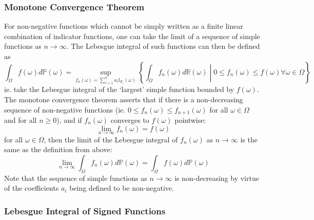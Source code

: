 \documentclass[11pt]{report} %
\begin{document}
\subsubsection{Monotone Convergence Theorem}

For non-negative functions which cannot be simply written as a finite linear combination of indicator functions, one can take the limit of a sequence of simple functions as $n \to \infty$. The Lebesgue integral of such functions can then be defined as
\begin{equation}
\int_{\Omega}f\left(\omega\right)d\mathbb{P}\left(\omega\right) = \sup_{f_{n}\left(\omega\right) = \sum_{i = 1}^{n}a_{i}\mathbb{I}_{E_{i}}\left(\omega\right)}\left\{\int_{\Omega}f_{n}\left(\omega\right)d\mathbb{R}\left(\omega\right)\middle|0\leq f_{n}\left(\omega\right) \leq f\left(\omega\right)\forall \omega \in \Omega\right\}
\end{equation}
ie. take the Lebesgue integral of the `largest' simple function bounded by $f\left(\omega\right)$. The monotone convergence theorem asserts that if there is a non-decreasing sequence of non-negative functions (ie. $0 \leq f_{n}\left(\omega\right) \leq f_{n + 1}\left(\omega\right)$ for all $\omega \in \Omega$ and for all $n \geq 0$), and if $f_{n}\left(\omega\right)$ converges to $f\left(\omega\right)$ pointwise:
\begin{equation}
\lim_{n\to\infty}f_{n}\left(\omega\right) = f\left(\omega\right)
\end{equation}
for all $\omega \in \Omega$, then the limit of the Lebesgue integral of $f_{n}\left(\omega\right)$ as $n \to \infty$ is the same as the definition from above:
\begin{equation}
\lim_{n\to\infty}\int_{\Omega}f_{n}\left(\omega\right)d\mathbb{P}\left(\omega\right) = \int_{\Omega}f\left(\omega\right)d\mathbb{P}\left(\omega\right)
\end{equation}
Note that the sequence of simple functions as $n\to\infty$ is non-decreasing by virtue of the coefficients $a_{i}$ being defined to be non-negative.

\subsubsection{Lebesgue Integral of Signed Functions}
\end{document}
